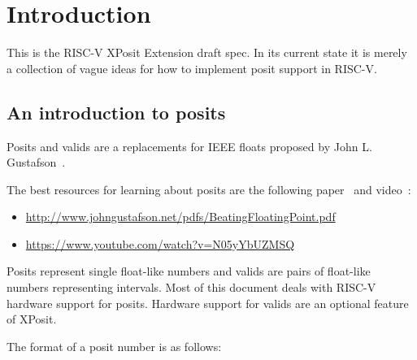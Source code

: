 \chapter{Introduction}

This is the RISC-V XPosit Extension draft spec. In its current state it is
merely a collection of vague ideas for how to implement posit support in RISC-V.

\section{An introduction to posits}

Posits and valids are a replacements for IEEE floats proposed by John L. Gustafson~\cite{PositArith,PositVideo,PositHub}.

The best resources for learning about posits are the following paper~\cite{PositArith} and video~\cite{PositVideo}:

\begin{itemize}
\item \url{http://www.johngustafson.net/pdfs/BeatingFloatingPoint.pdf}
\item \url{https://www.youtube.com/watch?v=N05yYbUZMSQ}
\end{itemize}

Posits represent single float-like numbers and valids are pairs of float-like numbers representing
intervals. Most of this document deals with RISC-V hardware support for posits. Hardware support
for valids are an optional feature of XPosit.

The format of a posit number is as follows:

\begin{center}
\end{center}

